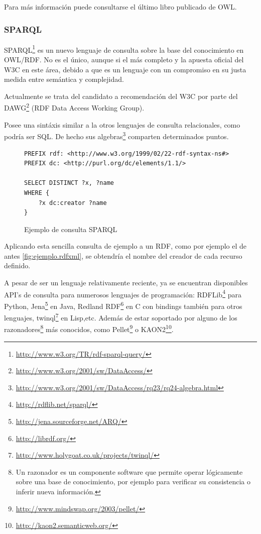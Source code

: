 Para más información puede consultarse el último libro publicado de 
OWL\cite{OWLBook}.

\subsubsection{SPARQL}

SPARQL\footnote{\url{http://www.w3.org/TR/rdf-sparql-query/}} es un nuevo lenguaje
de consulta sobre la base del conocimiento en OWL/RDF. No es el único\cite{ComparisonRDFQuery},
aunque si el más completo y la apuesta oficial del W3C en este área, debido a que es
un lenguaje con un compromiso en su justa medida entre semántica y 
complejidad\cite{SemanticsComplexitySPARQL}. 

Actualmente se trata del candidato a recomendación del W3C por parte del 
DAWG\footnote{\url{http://www.w3.org/2001/sw/DataAccess/}} (RDF Data Access Working 
Group).

Posee una sintáxis similar a la otros lenguajes de consulta relacionales, como
podría ser SQL. De hecho sus 
algebras\footnote{\url{http://www.w3.org/2001/sw/DataAccess/rq23/rq24-algebra.html}} comparten\cite{RelationalAlgebraSPARQL} determinados puntos. 

\begin{figure}[H]
\lstset{language=SPARQL}
\begin{lstlisting}
PREFIX rdf: <http://www.w3.org/1999/02/22-rdf-syntax-ns#>
PREFIX dc: <http://purl.org/dc/elements/1.1/>

SELECT DISTINCT ?x, ?name
WHERE {
	?x dc:creator ?name
}
\end{lstlisting}
\caption{Ejemplo de consulta SPARQL}
\label{fig:ejemplo.sparql}
\end{figure}

Aplicando esta sencilla consulta de ejemplo a un RDF, como por ejemplo el de 
antes \ref{fig:ejemplo.rdfxml}, se obtendría el nombre del creador de cada recurso
definido.

A pesar de ser un lenguaje relativamente reciente, ya se encuentran disponibles
API's de consulta para numerosos lenguajes de programación: 
RDFLib\footnote{\url{http://rdflib.net/sparql/}} para Python, 
Jena\footnote{\url{http://jena.sourceforge.net/ARQ/}} en Java, 
Redland RDF\footnote{\url{http://librdf.org/}} en C con bindings también para 
otros lenguajes, twinql\footnote{\url{http://www.holygoat.co.uk/projects/twinql/}} 
en Lisp,etc. Además de estar soportado por alguno de los razonadores\footnote{Un 
razonador es un componente software que permite operar lógicamente sobre una base 
de conocimiento, por ejemplo para verificar su consistencia o inferir nueva
información.} más conocidos, como Pellet\footnote{\url{http://www.mindswap.org/2003/pellet/}} 
o KAON2\footnote{\url{http://kaon2.semanticweb.org/}}.

